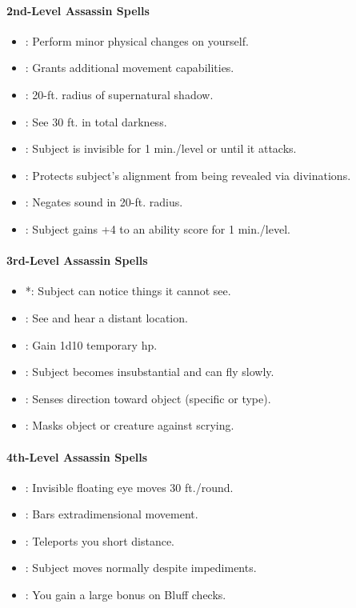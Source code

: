 \paragraph{2nd-Level Assassin Spells}
\begin{itemize}
\item {}: Perform minor physical changes on yourself.
\item {}: Grants additional movement capabilities.
\item {}: 20-ft. radius of supernatural shadow.
\item {}: See 30 ft. in total darkness.
\item {}: Subject is invisible for 1 min./level or until it attacks.
\item {}: Protects subject's alignment from being revealed via divinations.
\item {}: Negates sound in 20-ft. radius.
\item {}: Subject gains +4 to an ability score for 1 min./level.
\end{itemize}
\paragraph{3rd-Level Assassin Spells}
\begin{itemize}
\item {}*: Subject can notice things it cannot see.
\item {}: See and hear a distant location.
\item {}: Gain 1d10 temporary hp.
\item {}: Subject becomes insubstantial and can fly slowly.
\item {}: Senses direction toward object (specific or type).
\item {}: Masks object or creature against scrying.
\end{itemize}
\paragraph{4th-Level Assassin Spells}
\begin{itemize}
\item {}: Invisible floating eye moves 30 ft./round.
\item {}: Bars extradimensional movement.
\item {}: Teleports you short distance.
\item {}: Subject moves normally despite impediments.
\item {}: You gain a large bonus on Bluff checks.
\end{itemize}
